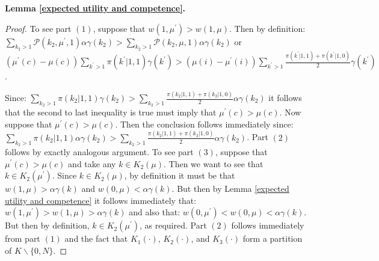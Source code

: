 \documentclass[11pt,]{article}
\begin{document}
\noindent\textbf{Lemma \ref{expected utility and competence}.}
\begin{proof}  To see part $(1)$, suppose that $w(1,\mu^{\prime})> w(1,\mu)$.  Then by definition: $\sum_{k_2>1}\mathcal{P}(k_2,\mu^{\prime},1)\alpha\gamma(k_2)>\sum_{k_2>1}\mathcal{P}(k_2,\mu,1)\alpha\gamma(k_2)$ or $\left(\mu^{\prime}(c)-\mu(c)\right)\sum_{k^{\prime}>1}\pi(k^{\prime}|1,1)\gamma(k^{\prime})>\left(\mu(i)-\mu^{\prime}(i)\right)\sum_{k^{\prime}>1}\frac{\pi(k^{\prime}|1,1)+\pi(k^{\prime}|1,0)}{2}\gamma(k^{\prime})$.

Since: $\sum_{k_2>1}\pi(k_2|1,1)\gamma(k_2)>\sum_{k_2>1}\frac{\pi(k_2|1,1)+\pi(k_2|1,0)}{2}\alpha\gamma(k_2)$ it follows that the second to last inequality is true must imply that $\mu^{\prime}(c)>\mu(c)$.  Now suppose that $\mu^{\prime}(c)>\mu(c)$.  Then the conclusion follows immediately since: $\sum_{k_2>1}\pi(k_2|1,1)\alpha\gamma(k_2)>\sum_{k_2>1}\frac{\pi(k_2|1,1)+\pi(k_2|1,0)}{2}\alpha\gamma(k_2)$.  Part $(2)$ follows by exactly analogous argument.  To see part $(3)$, suppose that $\mu^{\prime}(c)>\mu(c)$ and take any $k\in K_2(\mu)$.  Then we want to see that $k\in K_2(\mu^{\prime})$.  Since $k\in K_2(\mu)$, by definition it must be that $w(1,\mu)>\alpha\gamma(k)$ and $w(0,\mu)<\alpha\gamma(k)$.  But then by Lemma \ref{expected utility and competence} it follows immediately that: $w(1,\mu^{\prime})>w(1,\mu)>\alpha\gamma(k)$ and also that: $w(0,\mu^{\prime})< w(0,\mu)<\alpha\gamma(k)$.
 But then by definition, $k\in K_2(\mu^{\prime})$, as required.  Part $(2)$ follows immediately from part $(1)$ and the fact that $K_1(\cdot)$, $K_2(\cdot)$, and $K_3(\cdot)$ form a partition of $K\backslash\{0,N\}$.
\end{proof}
\end{document}
